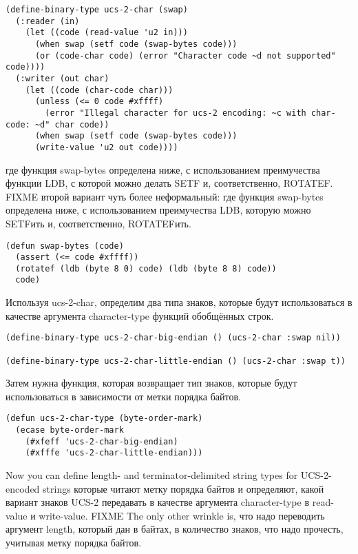 \begin{lstlisting}
(define-binary-type ucs-2-char (swap)
  (:reader (in)
    (let ((code (read-value 'u2 in)))
      (when swap (setf code (swap-bytes code)))
      (or (code-char code) (error "Character code ~d not supported" code))))
  (:writer (out char)
    (let ((code (char-code char)))
      (unless (<= 0 code #xffff)
        (error "Illegal character for ucs-2 encoding: ~c with char-code: ~d" char code))
      (when swap (setf code (swap-bytes code)))
      (write-value 'u2 out code))))
\end{lstlisting}

\noindent{}где функция swap-bytes определена ниже, с использованием преимучества функции LDB, с
которой можно делать SETF и, соответственно, ROTATEF.  FIXME второй вариант чуть более
неформальный: где функция swap-bytes определена ниже, с использованием преимучества LDB,
которую можно SETFить и, соответственно, ROTATEFить.


\begin{lstlisting}
(defun swap-bytes (code)
  (assert (<= code #xffff))
  (rotatef (ldb (byte 8 0) code) (ldb (byte 8 8) code))
  code)
\end{lstlisting}

Используя ucs-2-char, определим два типа знаков, которые будут использоваться в качестве
аргумента character-type функций обобщённых строк.

\begin{lstlisting}
(define-binary-type ucs-2-char-big-endian () (ucs-2-char :swap nil))

(define-binary-type ucs-2-char-little-endian () (ucs-2-char :swap t))
\end{lstlisting}

Затем нужна функция, которая возвращает тип знаков, которые будут использоваться в
зависимости от метки порядка байтов.

\begin{lstlisting}
(defun ucs-2-char-type (byte-order-mark)
  (ecase byte-order-mark
    (#xfeff 'ucs-2-char-big-endian)
    (#xfffe 'ucs-2-char-little-endian)))
\end{lstlisting}

Now you can define length- and terminator-delimited string types for UCS-2-encoded strings
которые читают метку порядка байтов и определяют, какой вариант знаков UCS-2 передавать в
качестве аргумента character-type в read-value и write-value.  FIXME The only other
wrinkle is, что надо переводить аргумент length, который дан в байтах, в количество
знаков, что надо прочесть, учитывая метку порядка байтов.

